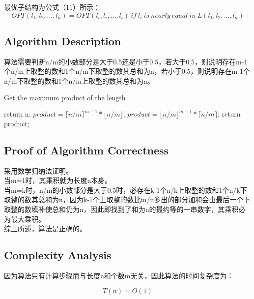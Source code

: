 \documentclass{article}
\begin{document}
最优子结构为公式（11）所示：
\begin{equation}
OPT(l_1,l_2,...,l_n) = OPT(l_i,l_i,...,l_i)\ if\ l_i\ is\ nearly\ equal\ in\  L(l_1,l_2,...,l_n)
\end{equation} 


\subsection{Algorithm Description}
算法需要判断n/m的小数部分是大于0.5还是小于0.5，若大于0.5，则说明存在m-1个n/m上取整的数和1个n/m下取整的数其总和为n，若小于0.5，则说明存在m-1个n/m下取整的数和1个n/m上取整的数其总和为n。


\begin{algorithm}[htbp]  
  \caption{Get the maximum product of the length}  
  \begin{algorithmic}[1] 
	\State return n;
	\EndIf
	\State $product = {\lceil n/m\rceil}^{m-1}\ast \lfloor n/m\rfloor$;
	\Else
	\State $product = {\lfloor n/m\rfloor}^{m-1}\ast \lceil n/m\rceil$;
	\EndIf
	\State return product;
    \EndFunction 
  \end{algorithmic}  
\end{algorithm} 



\subsection{Proof of Algorithm Correctness}
采用数学归纳法证明。\\

当m=1时，其乘积就为长度n本身。\\

当m=k时，n/m的小数部分是大于0.5时，必存在k-1个n/k上取整的数和1个n/k下取整的数其总和为n，因为k-1个上取整的数比m/n多出的部分加和会由最后一个下取整的数填补使总和仍为n，因此即找到了和为n的最约等的一串数字，其乘积必为最大乘积。\\

综上所述，算法是正确的。

\subsection{Complexity Analysis}
因为算法只有计算步骤而与长度n和个数m无关，因此算法的时间复杂度为：

\begin{equation}
T(n) = O(1)
\end{equation} 


\end{document}

